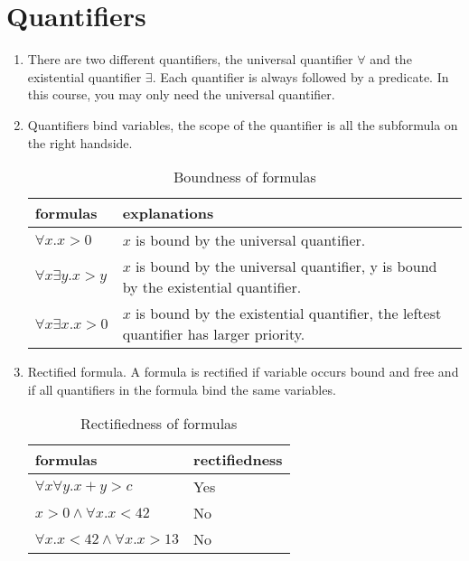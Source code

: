\documentclass[12pt]{article}
\begin{document}
\section*{Quantifiers}
\begin{enumerate}
    \item There are two different quantifiers, the universal quantifier $\forall$ and the existential quantifier $\exists$.
    Each quantifier is always followed by a predicate. In this course, you may only need the universal quantifier.
    \item Quantifiers bind variables, the scope of the quantifier is all the subformula on the right handside. 
    \begin{table}[ht]
        \centering 
        \begin{tabular}{|| p{2.5cm} | p{8cm} ||}
            \hline 
            formulas & explanations \\
            \hline \hline
            $\forall x. x > 0$ & $x$ is bound by the universal quantifier. \\
            \hline 
            $\forall x \exists y. x > y$ & $x$ is bound by the universal quantifier, 
              y is bound by the existential quantifier.\\
            \hline
            $\forall x \exists x. x > 0$ & $x$ is bound by the existential quantifier, 
              the leftest quantifier has larger priority.\\
            \hline 
        \end{tabular}
        \caption[Table 2]{Boundness of formulas}
    \end{table}
    \item Rectified formula. A formula is rectified if variable occurs bound and free and if all quantifiers
    in the formula bind the same variables. 
    \begin{table}[ht]
        \centering 
        \begin{tabular}{|| p{5cm} | p{2.5cm} ||}
            \hline 
            formulas & rectifiedness \\
            \hline \hline
            $\forall x \forall y. x + y > c$ & Yes \\
            \hline 
            $x > 0 \land \forall x . x < 42 $ & No \\
            \hline
            $\forall x. x < 42 \land \forall x. x > 13$ & No\\
            \hline 
        \end{tabular}
        \caption[Table 2]{Rectifiedness of formulas}

\end{table}
\end{enumerate}
\end{document}
